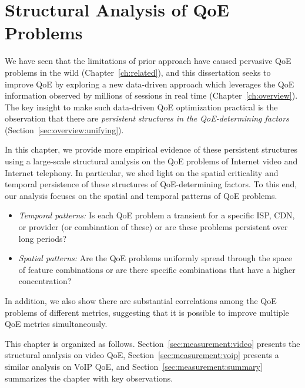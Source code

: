 \chapter{Structural Analysis of QoE Problems}
\label{ch:measurement}

We have seen that the limitations of prior approach have caused 
pervasive QoE problems in the wild (Chapter~\ref{ch:related}),
and this dissertation seeks to improve QoE by exploring a 
new data-driven approach which leverages the QoE information 
observed by millions of sessions in real time (Chapter~\ref{ch:overview}).
The key insight to make such data-driven QoE optimization practical
is the observation that there are {\em persistent structures in the 
QoE-determining factors} (Section~\ref{sec:overview:unifying}).

In this chapter, we provide more empirical evidence of these persistent
structures using a large-scale structural analysis on the 
QoE problems of Internet video and Internet telephony.
In particular, we shed light on the spatial criticality and 
temporal persistence of these structures of QoE-determining factors.
To this end, our analysis focuses on the spatial and temporal patterns
of QoE problems.
\begin{itemize}

\item {\em Temporal patterns:} 
Is each QoE problem a transient for 
a specific ISP, CDN, or provider (or combination of these) or are 
these problems persistent over long periods?

\item {\em Spatial patterns:} 
Are the QoE problems uniformly spread through the 
space of feature combinations or are there specific 
combinations that have a higher concentration?

\end{itemize}
In addition, we also show there are substantial correlations
among the QoE problems of different metrics, suggesting that
it is possible to improve multiple QoE metrics simultaneously.

This chapter is organized as follows. 
Section~\ref{sec:measurement:video} presents the structural analysis
on video QoE,
Section~\ref{sec:measurement:voip} presents a similar analysis on 
VoIP QoE, and Section~\ref{sec:measurement:summary} summarizes
the chapter with key observations.


